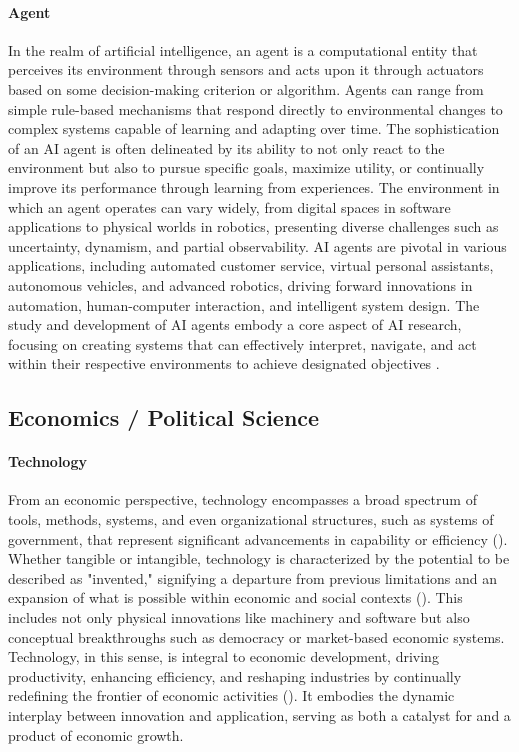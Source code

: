\documentclass{article}
\begin{document}
\paragraph{Agent}
In the realm of artificial intelligence, an agent is a computational entity that perceives its environment through sensors and acts upon it through actuators based on some decision-making criterion or algorithm. Agents can range from simple rule-based mechanisms that respond directly to environmental changes to complex systems capable of learning and adapting over time. The sophistication of an AI agent is often delineated by its ability to not only react to the environment but also to pursue specific goals, maximize utility, or continually improve its performance through learning from experiences. The environment in which an agent operates can vary widely, from digital spaces in software applications to physical worlds in robotics, presenting diverse challenges such as uncertainty, dynamism, and partial observability. AI agents are pivotal in various applications, including automated customer service, virtual personal assistants, autonomous vehicles, and advanced robotics, driving forward innovations in automation, human-computer interaction, and intelligent system design. The study and development of AI agents embody a core aspect of AI research, focusing on creating systems that can effectively interpret, navigate, and act within their respective environments to achieve designated objectives \cite{RussellNorvig2020, Wooldridge2009}.

\subsection{Economics / Political Science}

\paragraph{Technology}
From an economic perspective, technology encompasses a broad spectrum of tools, methods, systems, and even organizational structures, such as systems of government, that represent significant advancements in capability or efficiency (\cite{schumpeter}). Whether tangible or intangible, technology is characterized by the potential to be described as "invented," signifying a departure from previous limitations and an expansion of what is possible within economic and social contexts (\cite{north}). This includes not only physical innovations like machinery and software but also conceptual breakthroughs such as democracy or market-based economic systems. Technology, in this sense, is integral to economic development, driving productivity, enhancing efficiency, and reshaping industries by continually redefining the frontier of economic activities (\cite{romer}). It embodies the dynamic interplay between innovation and application, serving as both a catalyst for and a product of economic growth.
\end{document}

